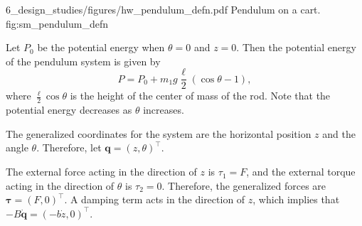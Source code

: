 
	{6_design_studies/figures/hw_pendulum_defn.pdf}
	{Pendulum on a cart.}
	{fig:sm_pendulum_defn}
	


Let $P_0$ be the potential energy when $\theta=0$ and $z=0$.  Then the potential energy of the pendulum system is given by
\[
P = P_0 + m_1 g \frac{\ell}{2} (\cos\theta-1),
\]
where $\frac{\ell}{2}\cos\theta$ is the height of the center of mass of the rod.
Note that the potential energy decreases as $\theta$ increases.

The generalized coordinates for the system are the horizontal position $z$ and the angle $\theta$.  Therefore, let $\mathbf{q} = (z, \theta)^\top$.

The external force acting in the direction of $z$ is $\tau_1 = F$, and the external torque acting in the direction of $\theta$ is $\tau_2=0$.  Therefore, the generalized forces are $\boldsymbol{\tau}=(F, 0)^\top$.  A damping term acts in the direction of $z$, which implies that
$-B\dot{\mathbf{q}} = (-b\dot{z}, 0)^\top$.


